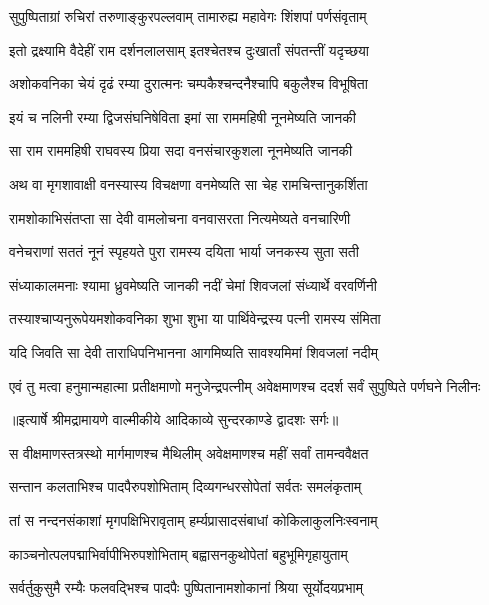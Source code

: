 \twolineshloka
{सुपुष्पिताग्रां रुचिरां तरुणाङ्कुरपल्लवाम्}
{तामारुह्य महावेगः शिंशपां पर्णसंवृताम्} %

\twolineshloka
{इतो द्रक्ष्यामि वैदेहीं राम दर्शनलालसाम्}
{इतश्चेतश्च दुःखार्तां संपतन्तीं यदृच्छया} %

\twolineshloka
{अशोकवनिका चेयं दृढं रम्या दुरात्मनः}
{चम्पकैश्चन्दनैश्चापि बकुलैश्च विभूषिता} %

\twolineshloka
{इयं च नलिनी रम्या द्विजसंघनिषेविता}
{इमां सा राममहिषी नूनमेष्यति जानकी} %

\twolineshloka
{सा राम राममहिषी राघवस्य प्रिया सदा}
{वनसंचारकुशला नूनमेष्यति जानकी} %

\twolineshloka
{अथ वा मृगशावाक्षी वनस्यास्य विचक्षणा}
{वनमेष्यति सा चेह रामचिन्तानुकर्शिता} %

\twolineshloka
{रामशोकाभिसंतप्ता सा देवी वामलोचना}
{वनवासरता नित्यमेष्यते वनचारिणी} %

\twolineshloka
{वनेचराणां सततं नूनं स्पृहयते पुरा}
{रामस्य दयिता भार्या जनकस्य सुता सती} %

\twolineshloka
{संध्याकालमनाः श्यामा ध्रुवमेष्यति जानकी}
{नदीं चेमां शिवजलां संध्यार्थे वरवर्णिनी} %

\twolineshloka
{तस्याश्चाप्यनुरूपेयमशोकवनिका शुभा}
{शुभा या पार्थिवेन्द्रस्य पत्नी रामस्य संमिता} %

\twolineshloka
{यदि जिवति सा देवी ताराधिपनिभानना}
{आगमिष्यति सावश्यमिमां शिवजलां नदीम्} %

\fourlineindentedshloka
{एवं तु मत्वा हनुमान्महात्मा}
{ प्रतीक्षमाणो मनुजेन्द्रपत्नीम्}
{अवेक्षमाणश्च ददर्श सर्वं}
{ सुपुष्पिते पर्णघने निलीनः} %


{॥इत्यार्षे श्रीमद्रामायणे वाल्मीकीये आदिकाव्ये सुन्दरकाण्डे द्वादशः सर्गः॥}


\twolineshloka
{स वीक्षमाणस्तत्रस्थो मार्गमाणश्च मैथिलीम्}
{अवेक्षमाणश्च महीं सर्वां तामन्ववैक्षत} %

\twolineshloka
{सन्तान कलताभिश्च पादपैरुपशोभिताम्}
{दिव्यगन्धरसोपेतां सर्वतः समलंकृताम्} %

\twolineshloka
{तां स नन्दनसंकाशां मृगपक्षिभिरावृताम्}
{हर्म्यप्रासादसंबाधां कोकिलाकुलनिःस्वनाम्} %

\twolineshloka
{काञ्चनोत्पलपद्माभिर्वापीभिरुपशोभिताम्}
{बह्वासनकुथोपेतां बहुभूमिगृहायुताम्} %

\twolineshloka
{सर्वर्तुकुसुमै रम्यैः फलवद्भिश्च पादपैः}
{पुष्पितानामशोकानां श्रिया सूर्योदयप्रभाम्} %

